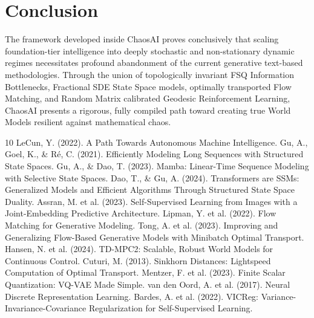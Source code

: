 \documentclass[11pt]{article}
\begin{document}
\section{Conclusion}
The framework developed inside ChaosAI proves conclusively that scaling foundation-tier intelligence into deeply stochastic and non-stationary dynamic regimes necessitates profound abandonment of the current generative text-based methodologies. Through the union of topologically invariant FSQ Information Bottlenecks, Fractional SDE State Space models, optimally transported Flow Matching, and Random Matrix calibrated Geodesic Reinforcement Learning, ChaosAI presents a rigorous, fully compiled path toward creating true World Models resilient against mathematical chaos.

\begin{thebibliography}{10}
 LeCun, Y. (2022). A Path Towards Autonomous Machine Intelligence.
 Gu, A., Goel, K., \& R\'e, C. (2021). Efficiently Modeling Long Sequences with Structured State Spaces.
 Gu, A., \& Dao, T. (2023). Mamba: Linear-Time Sequence Modeling with Selective State Spaces.
 Dao, T., \& Gu, A. (2024). Transformers are SSMs: Generalized Models and Efficient Algorithms Through Structured State Space Duality.
 Assran, M. et al. (2023). Self-Supervised Learning from Images with a Joint-Embedding Predictive Architecture.
 Lipman, Y. et al. (2022). Flow Matching for Generative Modeling.
 Tong, A. et al. (2023). Improving and Generalizing Flow-Based Generative Models with Minibatch Optimal Transport.
 Hansen, N. et al. (2024). TD-MPC2: Scalable, Robust World Models for Continuous Control.
 Cuturi, M. (2013). Sinkhorn Distances: Lightspeed Computation of Optimal Transport.
 Mentzer, F. et al. (2023). Finite Scalar Quantization: VQ-VAE Made Simple.
 van den Oord, A. et al. (2017). Neural Discrete Representation Learning.
 Bardes, A. et al. (2022). VICReg: Variance-Invariance-Covariance Regularization for Self-Supervised Learning.
\end{thebibliography}

\appendix
\end{document}
